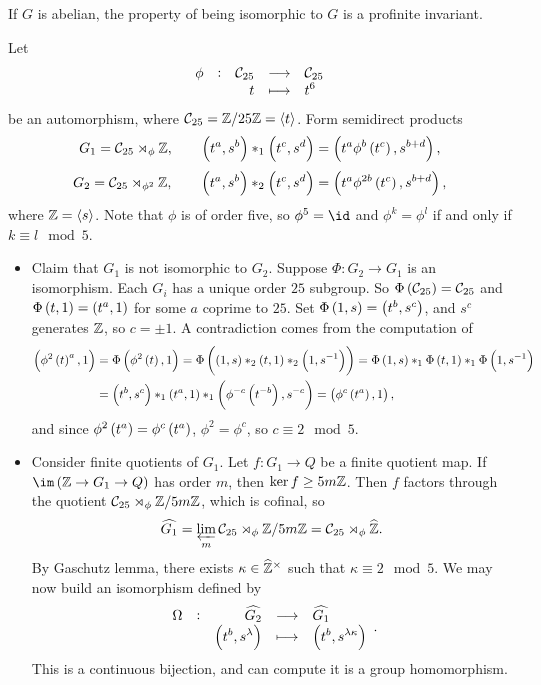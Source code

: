 \begin{corollary}
If $ G $ is abelian, the property of being isomorphic to $ G $ is a profinite invariant.
\end{corollary}

\begin{example}
Let
$$ \function[\phi]{\CCC_{25}}{\CCC_{25}}{t}{t^6} $$
be an automorphism, where $ \mathcal{C}_{25} = \mathbb{Z} / 25\mathbb{Z} = \left\langle t \right\rangle $. Form semidirect products
$$ G_1 = \CCC_{25} \rtimes_\phi \ZZ, \qquad \br{t^a, s^b} *_1 \br{t^c, s^d} = \br{t^a\phi^b\br{t^c}, s^{b + d}}, $$
$$ G_2 = \CCC_{25} \rtimes_{\phi^2} \ZZ, \qquad \br{t^a, s^b} *_2 \br{t^c, s^d} = \br{t^a\phi^{2b}\br{t^c}, s^{b + d}}, $$
where $ \mathbb{Z} = \left\langle s \right\rangle $. Note that $ \phi $ is of order five, so $ \phi^5 = \id $ and $ \phi^k = \phi^l $ if and only if $ k \equiv l \mod 5 $.
\begin{itemize}
\item Claim that $ G_1 $ is not isomorphic to $ G_2 $. Suppose $ \Phi : G_2 \to G_1 $ is an isomorphism. Each $ G_i $ has a unique order $ 25 $ subgroup. So $ \Phi\br{\CCC_{25}} = \CCC_{25} $ and $ \Phi\br{t, 1} = \br{t^a, 1} $ for some $ a $ coprime to $ 25 $. Set $ \Phi\br{1, s} = \br{t^b, s^c} $, and $ s^c $ generates $ \mathbb{Z} $, so $ c = \pm 1 $. A contradiction comes from the computation of
\begin{align*}
\br{\phi^2\br{t}^a, 1}
& = \Phi\br{\phi^2\br{t}, 1}
= \Phi\br{\br{1, s} *_2 \br{t, 1} *_2 \br{1, s^{-1}}}
= \Phi\br{1, s} *_1 \Phi\br{t, 1} *_1 \Phi\br{1, s^{-1}} \\
& = \br{t^b, s^c} *_1 \br{t^a, 1} *_1 \br{\phi^{-c}\br{t^{-b}}, s^{-c}}
= \br{\phi^c\br{t^a}, 1},
\end{align*}
and since $ \phi^2\br{t^a} = \phi^c\br{t^a} $, $ \phi^2 = \phi^c $, so $ c \equiv 2 \mod 5 $.
\item Consider finite quotients of $ G_1 $. Let $ f : G_1 \to Q $ be a finite quotient map. If $ \im \br{\ZZ \to G_1 \to Q} $ has order $ m $, then $ \ker f \ge 5m\mathbb{Z} $. Then $ f $ factors through the quotient $ \mathcal{C}_{25} \rtimes_\phi \mathbb{Z} / 5m\mathbb{Z} $, which is cofinal, so
$$ \widehat{G_1} = \varprojlim_m \mathcal{C}_{25} \rtimes_\phi \mathbb{Z} / 5m\mathbb{Z} = \mathcal{C}_{25} \rtimes_\phi \widehat{\mathbb{Z}}. $$
By Gaschutz lemma, there exists $ \kappa \in \widehat{\mathbb{Z}}^\times $ such that $ \kappa \equiv 2 \mod 5 $. We may now build an isomorphism defined by
$$ \function[\Omega]{\widehat{G_2}}{\widehat{G_1}}{\br{t^b, s^\lambda}}{\br{t^b, s^{\lambda\kappa}}}. $$
This is a continuous bijection, and can compute it is a group homomorphism.
\end{itemize}
\end{example}

